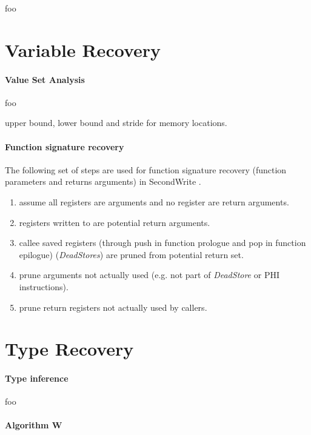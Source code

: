 \documentclass[10pt, a4paper, sigplan, authordraft]{acmart}
\begin{document}
foo


\section{Variable Recovery}

\paragraph{Value Set Analysis}

foo

upper bound, lower bound and stride for memory locations.

\paragraph{Function signature recovery}

The following set of steps are used for function signature recovery (function parameters and returns arguments) in SecondWrite \cite{scalable_type_detection}.

\begin{enumerate}
	\item assume all registers are arguments and no register are return arguments.
	\item registers written to are potential return arguments.
	\item callee saved registers (through push in function prologue and pop in function epilogue) (\textit{DeadStores}) are pruned from potential return set.
	\item prune arguments not actually used (e.g. not part of \textit{DeadStore} or PHI instructions).
	\item prune return registers not actually used by callers.
\end{enumerate}

\section{Type Recovery}

\paragraph{Type inference}

foo

\paragraph{Algorithm W}
\end{document}
